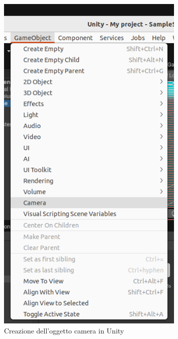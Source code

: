 \documentclass[11pt]{report}
\begin{document}
\begin{figure}[H]
    \centering
    \includegraphics[width=0.8\textwidth]{images/Immagine1.png}
    \caption{Creazione dell'oggetto camera in Unity}
    \label{fig:create_camera}
\end{figure}
\end{document}

